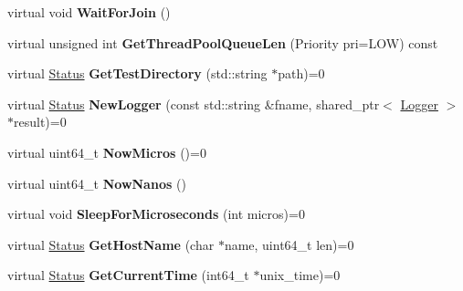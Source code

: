 \begin{DoxyCompactItemize}
\item 
virtual void {\bfseries Wait\+For\+Join} ()\hypertarget{classrocksdb_1_1Env_aa28d5c0cd42d458390cb3e8fe36a1455}{}\label{classrocksdb_1_1Env_aa28d5c0cd42d458390cb3e8fe36a1455}

\item 
virtual unsigned int {\bfseries Get\+Thread\+Pool\+Queue\+Len} (Priority pri=L\+OW) const\hypertarget{classrocksdb_1_1Env_a18280e4d314e5b867a04633479e9b048}{}\label{classrocksdb_1_1Env_a18280e4d314e5b867a04633479e9b048}

\item 
virtual \hyperlink{classrocksdb_1_1Status}{Status} {\bfseries Get\+Test\+Directory} (std\+::string $\ast$path)=0\hypertarget{classrocksdb_1_1Env_ad55bb21c00f55febdc9a199d28d1948c}{}\label{classrocksdb_1_1Env_ad55bb21c00f55febdc9a199d28d1948c}

\item 
virtual \hyperlink{classrocksdb_1_1Status}{Status} {\bfseries New\+Logger} (const std\+::string \&fname, shared\+\_\+ptr$<$ \hyperlink{classrocksdb_1_1Logger}{Logger} $>$ $\ast$result)=0\hypertarget{classrocksdb_1_1Env_aa95f36590fd6a28f78fcd419fc3692c9}{}\label{classrocksdb_1_1Env_aa95f36590fd6a28f78fcd419fc3692c9}

\item 
virtual uint64\+\_\+t {\bfseries Now\+Micros} ()=0\hypertarget{classrocksdb_1_1Env_a20e69bbefe7d92b92a2f33100cf251b7}{}\label{classrocksdb_1_1Env_a20e69bbefe7d92b92a2f33100cf251b7}

\item 
virtual uint64\+\_\+t {\bfseries Now\+Nanos} ()\hypertarget{classrocksdb_1_1Env_ae5122204652862ba303b904aa4f4cdd6}{}\label{classrocksdb_1_1Env_ae5122204652862ba303b904aa4f4cdd6}

\item 
virtual void {\bfseries Sleep\+For\+Microseconds} (int micros)=0\hypertarget{classrocksdb_1_1Env_a93416572ace483f9a64c6a531ccc016b}{}\label{classrocksdb_1_1Env_a93416572ace483f9a64c6a531ccc016b}

\item 
virtual \hyperlink{classrocksdb_1_1Status}{Status} {\bfseries Get\+Host\+Name} (char $\ast$name, uint64\+\_\+t len)=0\hypertarget{classrocksdb_1_1Env_a6ee02c3a73c1a5f17a8bf197ffb1a0dd}{}\label{classrocksdb_1_1Env_a6ee02c3a73c1a5f17a8bf197ffb1a0dd}

\item 
virtual \hyperlink{classrocksdb_1_1Status}{Status} {\bfseries Get\+Current\+Time} (int64\+\_\+t $\ast$unix\+\_\+time)=0\hypertarget{classrocksdb_1_1Env_a70ed14df4e067de0f2a8a09010eaf31b}{}\label{classrocksdb_1_1Env_a70ed14df4e067de0f2a8a09010eaf31b}


\end{DoxyCompactItemize}
